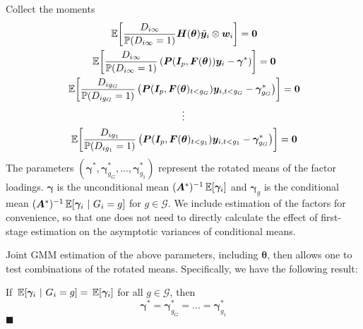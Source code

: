Collect the moments 
\begin{gather*}
    \expec{\frac{D_{i \infty}}{\mathbb{P}(D_{i \infty} = 1)}\bm H(\bm{\theta}) \tilde{\bm y}_i \otimes \bm w_i} = \bm 0\\
    \expec{\frac{D_{i \infty}}{\mathbb{P}(D_{i \infty} = 1)} \left( \bm P(\bm I_p, \bm{F}(\bm{\theta})) \bm y_i - \bm \gamma^* \right)} = \bm 0\\
    \expec{\frac{D_{i g_G}}{\mathbb{P}(D_{ig_G} = 1)} \left( \bm P(\bm I_p, \bm{F}(\bm{\theta})_{t < g_G}) \bm y_{i,t < g_G} - \bm \gamma_{g_G}^* \right) } = \bm 0\\
    \vdots\\
    \expec{\frac{D_{i g_1}}{\mathbb{P}(D_{ig_1} = 1)} \left( \bm P(\bm I_p, \bm{F}(\bm{\theta})_{t < g_1}) \bm y_{i,t < g_1} - \bm \gamma_{g_G}^* \right) } = \bm 0
\end{gather*}
The parameters $(\bm \gamma^*, \bm \gamma_{g_G}^*,...,\bm \gamma_{g_1}^*)$ represent the rotated means of the factor loadings. $\bm \gamma$ is the unconditional mean $(\bm A^*)^{-1}\expec{\bm \gamma_i}$ and $\bm \gamma_g$ is the conditional mean $(\bm A^*)^{-1}\expec{\bm \gamma_i}{G_i = g}$ for $g \in \mathcal{G}$. We include estimation of the factors for convenience, so that one does not need to directly calculate the effect of first-stage estimation on the asymptotic variances of conditional means. 

Joint GMM estimation of the above parameters, including $\bm{\theta}$, then allows one to test combinations of the rotated means. Specifically, we have the following result: 
\begin{theorem}
    If $\expec{\bm \gamma_i}{G_i = g} = \expec{\bm \gamma_i}$ for all $g \in \mathcal{G}$, then
    \begin{equation}
        \bm \gamma^* = \bm \gamma_{g_G}^* = ... = \bm \gamma_{g_1}^*
    \end{equation}
    $\blacksquare$
\end{theorem}
